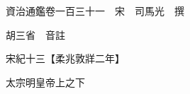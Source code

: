 










 


 
 


 

  
  
  
  
  





  
  
  
  
  
 
  

  

  
  
  



  

 
 

  
   




  

  
  


  　　資治通鑑卷一百三十一　宋　司馬光　撰

　　胡三省　音註

　　宋紀十三【柔兆敦牂二年】

　　太宗明皇帝上之下

